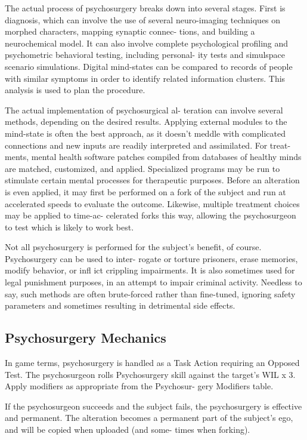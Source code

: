 The actual process of psychosurgery breaks down 
into several stages. First is diagnosis, which can 
involve the use of several neuro-imaging techniques 
on morphed characters, mapping synaptic connec-
tions, and building a neurochemical model. It can 
also involve complete psychological profiling  and 
psychometric behavioral testing, including personal-
ity tests and simulspace scenario simulations. Digital 
mind-states can be compared to records of people 
with similar symptoms in order to identify related 
information clusters. This analysis is used to plan 
the procedure.

The actual implementation of psychosurgical al-
teration can involve several methods, depending on 
the desired results. Applying external modules to the 
mind-state is often the best approach, as it doesn't 
meddle with complicated connections and new inputs 
are readily interpreted and assimilated. For treat-
ments, mental health software patches compiled from 
databases of healthy minds are matched, customized, 
and applied. Specialized programs may be run to 
stimulate certain mental processes for therapeutic 
purposes. Before an alteration is even applied, it may 
first be performed on a fork of the subject and run at 
accelerated speeds to evaluate the outcome. Likewise, 
multiple treatment choices may be applied to time-ac-
celerated forks this way, allowing the psychosurgeon 
to test which is likely to work best.

Not all psychosurgery is performed for the subject's 
benefit, of course. Psychosurgery can be used to inter-
rogate or torture prisoners, erase memories, modify 
behavior, or infl ict crippling impairments. It is also 
sometimes used for legal punishment purposes, in 
an attempt to impair criminal activity. Needless to 
say, such methods are often brute-forced rather than 
fine-tuned, ignoring safety parameters and sometimes 
resulting in detrimental side effects.

\subsection{Psychosurgery Mechanics}

In game terms, psychosurgery is handled as a Task 
Action requiring an Opposed Test. The psychosurgeon 
rolls Psychosurgery skill against the target's WIL x 3. 
Apply modifiers as appropriate from the Psychosur-
gery Modifiers table.

If the psychosurgeon succeeds and the subject fails, 
the psychosurgery is effective and permanent. The 
alteration becomes a permanent part of the subject's 
ego, and will be copied when uploaded (and some-
times when forking).

